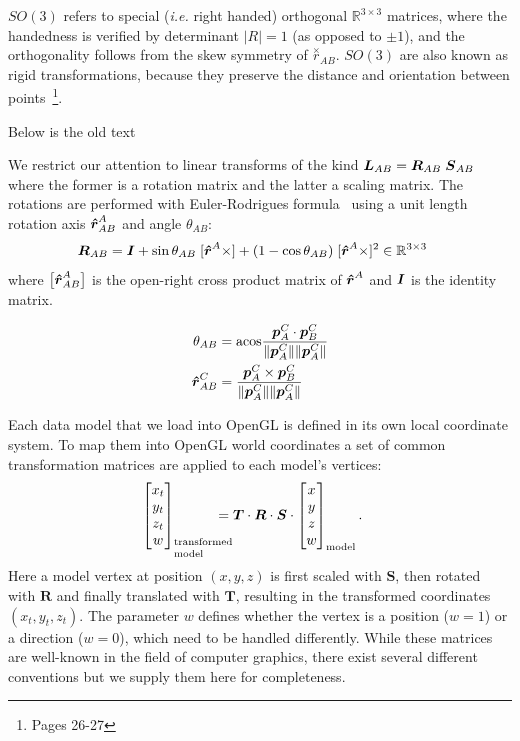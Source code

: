 $SO(3)$ refers to special (\emph{i.e.} right handed) orthogonal $\mathbb{R}^{3\times3}$ matrices, where the handedness is verified by determinant $\big|R\big|=1$ (as opposed to $\pm1$), and the orthogonality follows from the skew symmetry of $\overset{\times}{r}_{AB}$. $SO(3)$ are also known as rigid transformations, because they preserve the distance and orientation between points~\cite{Murray1994}\footnote{Pages 26-27}.

{\color{blue}Below is the old text}

We restrict our attention to linear transforms of the kind $\boldsymbol{L}_{AB} = \boldsymbol{R}_{AB}\;\boldsymbol{S}_{AB}$ where the former is a rotation matrix and the latter a scaling matrix. The rotations are performed with Euler-Rodrigues formula~\cite{Dai2015} using a unit length rotation axis $\boldsymbol{\hat{r}}_{AB}^A$ and angle $\theta_{AB}$:
%
\begin{align}\label{eq:M}
\mat{R}_{AB} &= \I + \sin\theta_{AB}\;[\dvec{\hat{r}}^A\times] + (1-\cos\theta_{AB})\;[\dvec{\hat{r}}^A\times]^2 \in\mathbb{R}^{3\times3}
\end{align}
%
where $\big[\boldsymbol{\hat{r}}_{AB}^A\big]$ is the open-right cross product matrix of $\boldsymbol{\hat{r}}^A$ and $\boldsymbol{I}$ is the identity matrix. 

\begin{align}
\theta_{AB}
&= \mathrm{acos}\frac{\boldsymbol{p}_{A}^{C}\cdot\boldsymbol{p}_{B}^{C}}{\lVert\boldsymbol{p}_{A}^{C}\rVert\lVert\boldsymbol{p}_{A}^{C}\rVert} \\
\boldsymbol{\hat{r}}_{AB}^C &=  \frac{\boldsymbol{p}_{A}^{C}\times\boldsymbol{p}_{B}^{C}}{\lVert\boldsymbol{p}_{A}^{C}\rVert\lVert\boldsymbol{p}_{A}^{C}\rVert}
\end{align}


Each data model that we load into OpenGL is defined in its own local coordinate system. To map them into OpenGL world coordinates a set of common transformation matrices are applied to each model's vertices:
%
\begin{align}
\bmat{x_t \\ y_t \\ z_t \\ w}_\text{\parbox{1cm}{\setlength\baselineskip{0.3cm}transformed\\model}} &= \boldsymbol{T} \cdot \boldsymbol{R} \cdot \boldsymbol{S} \cdot \bmat{x \\ y \\ z \\ w}_\text{model}.
\end{align}
%
Here a model vertex at position $(x,y,z)$ is first scaled with $\boldsymbol{S}$, then rotated with $\boldsymbol{R}$ and finally translated with $\boldsymbol{T}$, resulting in the transformed coordinates $(x_t,y_t,z_t)$. The parameter $w$ defines whether the vertex is a position ($w=1$) or a direction ($w=0$), which need to be handled differently. While these matrices are well-known in the field of computer graphics, there exist several different conventions but we supply them here for completeness.

